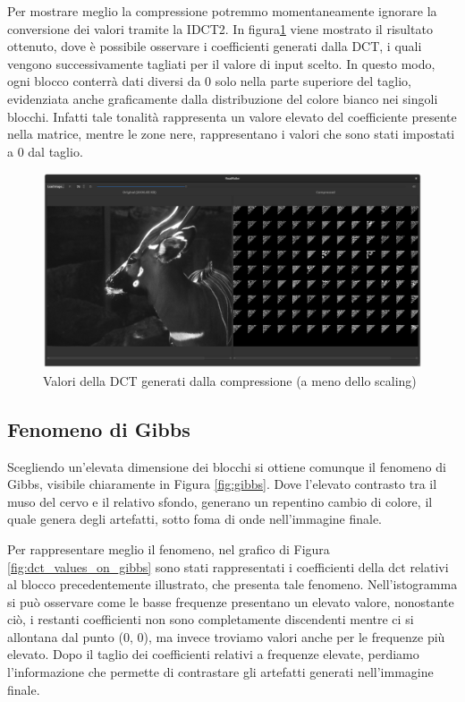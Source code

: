 Per mostrare meglio la compressione potremmo momentaneamente ignorare la conversione dei valori tramite la IDCT2. In figura\ref{fig:compression_values} viene mostrato il risultato ottenuto, dove è possibile osservare i coefficienti generati dalla DCT, i quali vengono successivamente tagliati per il valore di input scelto. In questo modo, ogni blocco conterrà dati diversi da 0 solo nella parte superiore del taglio, evidenziata anche graficamente dalla distribuzione del colore bianco nei singoli blocchi. Infatti tale tonalità rappresenta un valore elevato del coefficiente presente nella matrice, mentre le zone nere, rappresentano i valori che sono stati impostati a 0 dal taglio.

\begin{figure}[h]
	\centering
	\includegraphics[width=1\linewidth]{figures/qt_dct_values}
	\caption{Valori della DCT generati dalla compressione (a meno dello scaling)}
	\label{fig:compression_values}
\end{figure}

\subsection{Fenomeno di Gibbs}

Scegliendo un'elevata dimensione dei blocchi si ottiene comunque il fenomeno di Gibbs, visibile chiaramente in Figura \ref{fig:gibbs}. Dove l'elevato contrasto tra il muso del cervo e il relativo sfondo, generano un repentino cambio di colore, il quale genera degli artefatti, sotto foma di onde nell'immagine finale.

Per rappresentare meglio il fenomeno, nel grafico di Figura \ref{fig:dct_values_on_gibbs} sono stati rappresentati i coefficienti della dct relativi al blocco precedentemente illustrato, che presenta tale fenomeno. Nell'istogramma si può osservare come le basse frequenze presentano un elevato valore, nonostante ciò, i restanti coefficienti non sono completamente discendenti mentre ci si allontana dal punto (0, 0), ma invece troviamo valori anche per le frequenze più elevato. Dopo il taglio dei coefficienti relativi a frequenze elevate, perdiamo l'informazione che permette di contrastare gli artefatti generati nell'immagine finale.

